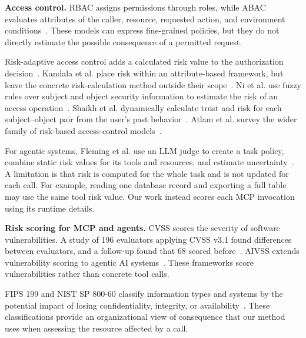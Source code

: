 \documentclass[sigconf]{acmart}
\begin{document}
\textbf{Access control.} 
RBAC assigns permissions through roles, while ABAC evaluates attributes of the
caller, resource, requested action, and environment
conditions~\cite{sandhu1996rbac,hu2014abac}. These models can express
fine-grained policies, but they do not directly estimate the possible
consequence of a permitted request.

Risk-adaptive access control adds a calculated risk value to the authorization
decision~\cite{cheng2007fuzzymls}. Kandala et al. place risk within an
attribute-based framework, but leave the concrete risk-calculation method
outside their scope~\cite{kandala2011radac}. Ni et al. use fuzzy rules over
subject and object security information to estimate the risk of an access
operation~\cite{ni2010fuzzy}. Shaikh et al. dynamically calculate trust and
risk for each subject--object pair from the user's past
behavior~\cite{shaikh2012dynamic}. Atlam et al. survey the wider family of
risk-based access-control models~\cite{atlam2020riskbased}.

For agentic systems, Fleming et al. use an LLM judge to create a task policy,
combine static risk values for its tools and resources, and estimate
uncertainty~\cite{fleming2025tbac}. A limitation is that risk is computed for
the whole task and is not updated for each call. For example, reading one
database record and exporting a full table may use the same tool risk value.
Our work instead scores each MCP invocation using its runtime details.

\textbf{Risk scoring for MCP and agents.} 
CVSS scores the severity of software vulnerabilities. A study of 196 evaluators
applying CVSS v3.1 found differences between evaluators, and a follow-up found
that 68%
scored before~\cite{first2023cvss,wunder2024cvss}. AIVSS extends vulnerability
scoring to agentic AI systems~\cite{owasp2026aivss}. These frameworks score
vulnerabilities rather than concrete tool calls.

FIPS 199 and NIST SP 800-60 classify information types and systems by the
potential impact of losing confidentiality, integrity, or
availability~\cite{nist2004fips199,nist2008sp80060}. These classifications
provide an organizational view of consequence that our method uses when
assessing the resource affected by a call.
\end{document}
